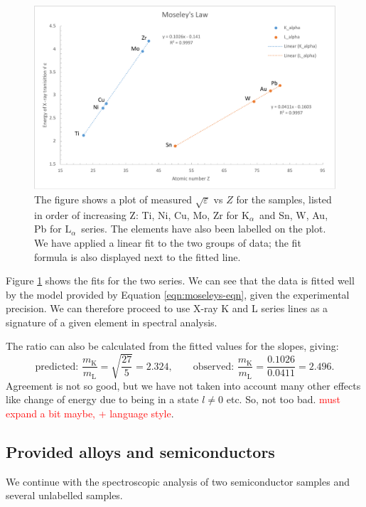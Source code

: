 \documentclass[11pt,a4paper,twoside,onecolumn]{article}
\newcommand{\reminder}[1]{\textcolor{red}{#1}}
\newcommand{\Kalpha}{$\mathrm{K}_\alpha$~}
\newcommand{\Lalpha}{$\mathrm{L}_\alpha$~}
\begin{document}
\begin{figure}[!htbp]
    \centering
    \includegraphics[width=\textwidth]{img/moseleys.pdf}
    \caption{The figure shows a plot of measured $\sqrt{\varepsilon}$ vs $Z$ for the samples, listed in order of increasing Z: Ti, Ni, Cu, Mo, Zr for \Kalpha and Sn, W, Au, Pb for \Lalpha series. The elements have also been labelled on the plot. We have applied a linear fit to the two groups of data; the fit formula is also displayed next to the fitted line.}\label{fig:moseleys}
\end{figure}

Figure \ref{fig:moseleys} shows the fits for the two series. We can see that the data is fitted well by the model provided by Equation \eqref{eqn:moseleys-eqn}, given the experimental precision. We can therefore proceed to use X-ray K and L series lines as a signature of a given element in spectral analysis.

The ratio can also be calculated from the fitted values for the slopes, giving:
\begin{equation}
    \text{predicted: }\frac{m_\mathrm{K}}{m_\mathrm{L}} = \sqrt{\frac{27}{5}} = 2.324,\qquad \text{observed: } \frac{m_\mathrm{K}}{m_\mathrm{L}} = \frac{0.1026}{0.0411} = 2.496.
\end{equation}
Agreement is not so good, but we have not taken into account many other effects like change of energy due to being in a state $l \neq 0$ etc. So, not too bad. \reminder{must expand a bit maybe, + language style}.

\subsection{Provided alloys and semiconductors}
We continue with the spectroscopic analysis of two semiconductor samples and several unlabelled samples.
\end{document}
